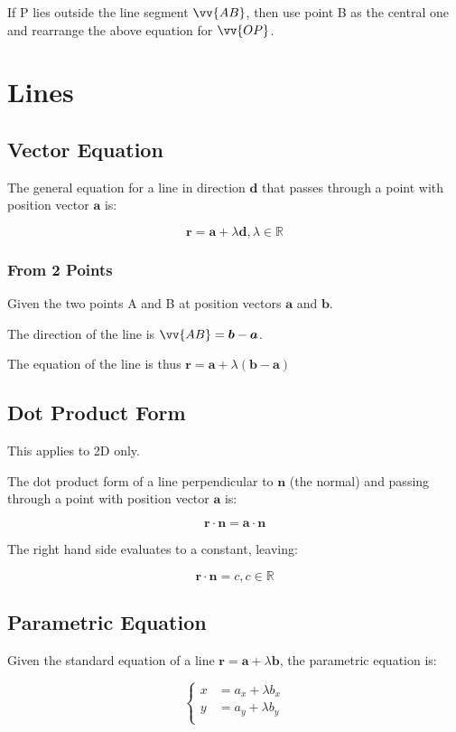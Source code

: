 \documentclass[a4paper,11pt]{article}
\newcommand{\bb}{\boldsymbol}
\begin{document}
If P lies outside the line segment $\vv{AB}$, then use point B as the central
one and rearrange the above equation for $\vv{OP}$.


\section{Lines}

\subsection{Vector Equation}

The general equation for a line in direction $\bb{d}$ that passes through a
point with position vector $\bb{a}$ is:

$$
\bb{r} = \bb{a} + \lambda \bb{d}, \lambda \in \mathbb{R}
$$


\subsubsection{From 2 Points}

Given the two points A and B at position vectors $\bb{a}$ and $\bb{b}$.

The direction of the line is $\vv{AB} = \bb{b} - \bb{a}$.

The equation of the line is thus $\bb{r} = \bb{a} + \lambda (\bb{b} - \bb{a})$


\subsection{Dot Product Form}

This applies to 2D only.

The dot product form of a line perpendicular to $\bb{n}$ (the normal) and
passing through a point with position vector $\bb{a}$ is:

$$
\bb{r} \cdot \bb{n} = \bb{a} \cdot \bb{n}
$$

The right hand side evaluates to a constant, leaving:

$$
\bb{r} \cdot \bb{n} = c, c \in \mathbb{R}
$$


\subsection{Parametric Equation}

Given the standard equation of a line $\bb{r} = \bb{a} + \lambda \bb{b}$, the
parametric equation is:

$$
\begin{cases}
	x & = a_x + \lambda b_x \\
	y & = a_y + \lambda b_y \\
\end{cases}
$$
\end{document}
